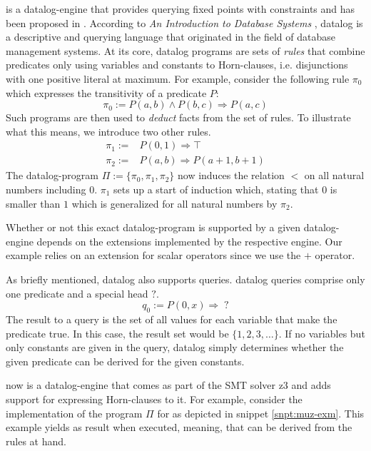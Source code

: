 \muZ{} is a \gls{datalog}-engine that provides querying fixed points with constraints and has been proposed in \cite{Hoder11}.
According to \textit{An Introduction to Database Systems} \cite[p.790ff]{Date00}, \gls{datalog} is a descriptive and querying language that originated in the field of database management systems.
At its core, \gls{datalog} programs are sets of \textit{rules} that combine predicates only using variables and constants to Horn-clauses, i.e. disjunctions with one positive literal at maximum.
For example, consider the following rule $ \pi_0 $ which expresses the transitivity of a predicate $ P $:
\begin{equation*}
    \pi_0 := P(a, b) \land P(b, c) \Rightarrow P(a, c)
\end{equation*}
Such programs are then used to \textit{deduct} facts from the set of rules.
To illustrate what this means, we introduce two other rules.
\begin{align*}
    \pi_1 := & P(0, 1) \Rightarrow \top \\
    \pi_2 := & P(a, b) \Rightarrow P(a + 1, b + 1)
\end{align*}
The \gls{datalog}-program $ \Pi := \{ \pi_0, \pi_1, \pi_2 \} $ now induces the relation $ < $ on all natural numbers including $ 0 $.
$ \pi_1 $ sets up a start of induction which, stating that $ 0 $ is smaller than $ 1 $ which is generalized for all natural numbers by $ \pi_2 $.

Whether or not this exact \gls{datalog}-program is supported by a given \gls{datalog}-engine depends on the extensions implemented by the respective engine.
Our example relies on an extension for scalar operators since we use the $ + $ operator.

As briefly mentioned, \gls{datalog} also supports queries.
\gls{datalog} queries comprise only one predicate and a special head $ ? $.
\begin{equation*}
    q_0 := P(0, x) \Rightarrow \; ?
\end{equation*}
The result to a query is the set of all values for each variable that make the predicate true.
In this case, the result set would be $ \{ 1, 2, 3, \dots \} $.
If no variables but only constants are given in the query, \gls{datalog} simply determines whether the given predicate can be derived for the given constants.

\muZ{} now is a \gls{datalog}-engine that comes as part of the SMT solver z3 \cite{Moura08} and adds support for expressing Horn-clauses to it.
For example, consider the implementation of the program $ \Pi $ for \muZ{} as depicted in snippet \ref{snpt:muz-exm}.
This example yields  as result when executed, meaning, that  can be derived from the rules at hand.

